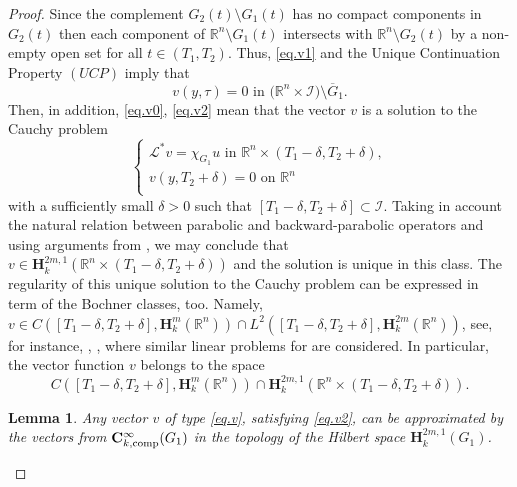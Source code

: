 \documentclass{amsart}
\newtheorem{lem}[thm]{Lemma}
\theoremstyle{definition}
\theoremstyle{remark}
\numberwithin{equation}{section}
\begin{document}
\begin{proof}
Since  the complement $G_2 (t) \setminus  G_1(t)$ has no compact components in 
$G_2(t)$  then each component of ${\mathbb R}^{n} \setminus G_1(t) $ intersects with 
${\mathbb R}^{n} \setminus  G_2(t) $ by a non-empty open set for all $t \in (T_1,T_2)$. 
Thus, \eqref{eq.v1} and the Unique Continuation Property $(UCP)$
imply that 
\begin{equation} \label{eq.v2}
v (y,\tau) = 0   \mbox{ in } \Big({\mathbb R}^{n} \times \mathcal{I}\Big)  \setminus \overline G_1 .
\end{equation}
 Then, in addition,  \eqref{eq.v0}, \eqref{eq.v2} mean that the vector  
 $v$ is a solution to the Cauchy problem 
$$
\left\{
\begin{array}{lll}
{\mathcal L}^*  v = \chi_{G_1} u \mbox{ in } {\mathbb R}^{n}  \times 
(T_1-\delta,T_2+\delta),\\
 v(y,T_2+\delta) = 0 \mbox{ on } {\mathbb R}^{n} \\
\end{array}
\right.
$$
with a sufficiently small $\delta>0$ such that $[T_1-\delta,T_2+\delta] \subset \mathcal{I}$. 
Taking in account the natural relation between parabolic and backward-parabolic operators and 
using arguments from  \cite[ch. 2, \S 5 theorem 3]{Kry08}, we may conclude that  
$v\in \mathbf{H}^{2m,1} _k ({\mathbb R}^{n} \times (T_1-\delta,T_2+\delta))$ and the 
solution is unique in this class. The regularity of this unique solution to the Cauchy 
problem can be expressed in term of the Bochner classes, too. Namely, 
 $v\in C ( [T_1-\delta,T_2+\delta], \mathbf{H}^{m}_k({\mathbb R}^{n}) )
\cap L^2 ([T_1-\delta,T_2+\delta], \mathbf{H}^{2m}_k ({\mathbb R}^{n}) )$, 
see, for instance, \cite{Lion69}, \cite[ch. 3, \S 1]{Tema79}, where similar linear problems 
for  are considered. In particular, the vector function 
 $v$ belongs to the space 
\begin{equation} \label{eq.space.1}
 C ( [T_1-\delta,T_2+\delta], \mathbf{H}^{m}_k({\mathbb R}^{n}) )
\cap \textbf{H}^{2m,1}_k ({\mathbb R}^{n}  \times (T_1-\delta,T_2+\delta))  .
\end{equation}

\begin{lem} \label{l.dense.c0} Any vector $v$ of type \eqref{eq.v}, satisfying 
\eqref{eq.v2}, can be approximated by the vectors from 
$\mathbf{C}^\infty_{k,{\rm comp}}  (G_1)$ in the topology of the Hilbert space 
$\mathbf{H}^{2m,1}_k (G_1)$. 
\end{lem}


\end{proof}
\end{document}
